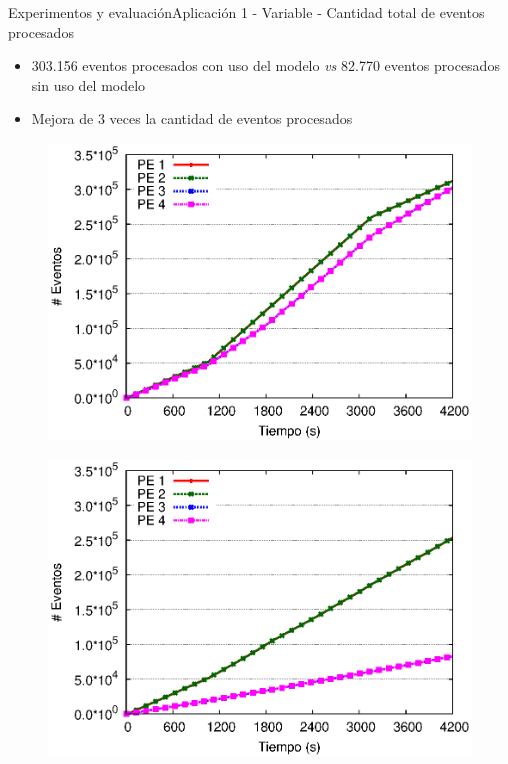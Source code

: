 \begin{frame}{Experimentos y evaluación}{Aplicación 1 - Variable - Cantidad total de eventos procesados}

\begin{itemize}
\item 303.156 eventos procesados con uso del modelo \textit{vs} 82.770 eventos procesados sin uso del modelo
\item Mejora de 3 veces la cantidad de eventos procesados
\end{itemize}

\begin{multicols}{2}
\begin{figure}[p]
	\centering
	\includegraphics[scale=0.475]{images/exp/app1/normal/cm/eventCount.eps}
\end{figure}

\begin{figure}[p]
	\centering
	\includegraphics[scale=0.475]{images/exp/app1/normal/sm/eventCount.eps}
\end{figure}
\end{multicols}
\end{frame}


